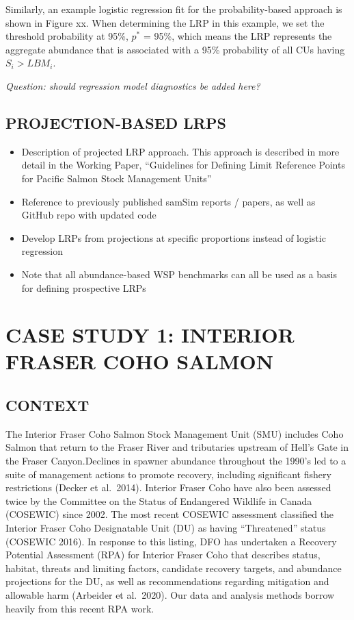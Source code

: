 \documentclass[11pt]{book}
\begin{document}
Similarly, an example logistic regression fit for the probability-based approach is shown in Figure xx. When determining the LRP in this example, we set the threshold probability at 95\%, \(p^*\) = 95\%, which means the LRP represents the aggregate abundance that is associated with a 95\% probability of all CUs having \(S_i > LBM_i\).

\emph{Question: should regression model diagnostics be added here?}

\hypertarget{projection-based-lrps}{%
\subsection{PROJECTION-BASED LRPS}\label{projection-based-lrps}}
\begin{itemize}
\item
  Description of projected LRP approach. This approach is described in more detail in the Working Paper, ``Guidelines for Defining Limit Reference Points for Pacific Salmon Stock Management Units''
\item
  Reference to previously published samSim reports / papers, as well as GitHub repo with updated code
\item
  Develop LRPs from projections at specific proportions instead of logistic regression
\item
  Note that all abundance-based WSP benchmarks can all be used as a basis for defining prospective LRPs
\end{itemize}
\hypertarget{case-study-1-interior-fraser-coho-salmon}{%
\section{CASE STUDY 1: INTERIOR FRASER COHO SALMON}\label{case-study-1-interior-fraser-coho-salmon}}

\hypertarget{context}{%
\subsection{CONTEXT}\label{context}}

The Interior Fraser Coho Salmon Stock Management Unit (SMU) includes Coho Salmon that return to the Fraser River and tributaries upstream of Hell's Gate in the Fraser Canyon.Declines in spawner abundance throughout the 1990's led to a suite of management actions to promote recovery, including significant fishery restrictions (Decker et al.~2014). Interior Fraser Coho have also been assessed twice by the Committee on the Status of Endangered Wildlife in Canada (COSEWIC) since 2002. The most recent COSEWIC assessment classified the Interior Fraser Coho Designatable Unit (DU) as having ``Threatened'' status (COSEWIC 2016). In response to this listing, DFO has undertaken a Recovery Potential Assessment (RPA) for Interior Fraser Coho that describes status, habitat, threats and limiting factors, candidate recovery targets, and abundance projections for the DU, as well as recommendations regarding mitigation and allowable harm (Arbeider et al.~2020). Our data and analysis methods borrow heavily from this recent RPA work.
\end{document}

